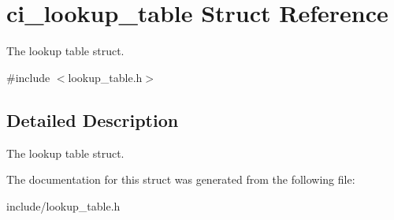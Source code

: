 \hypertarget{structci__lookup__table}{
\section{ci\_\-lookup\_\-table Struct Reference}
\label{structci__lookup__table}
}


The lookup table struct.  


{\ttfamily \#include $<$lookup\_\-table.h$>$}

\subsection{Detailed Description}
The lookup table struct. 

The documentation for this struct was generated from the following file:\begin{DoxyCompactItemize}
\item 
include/lookup\_\-table.h\end{DoxyCompactItemize}
